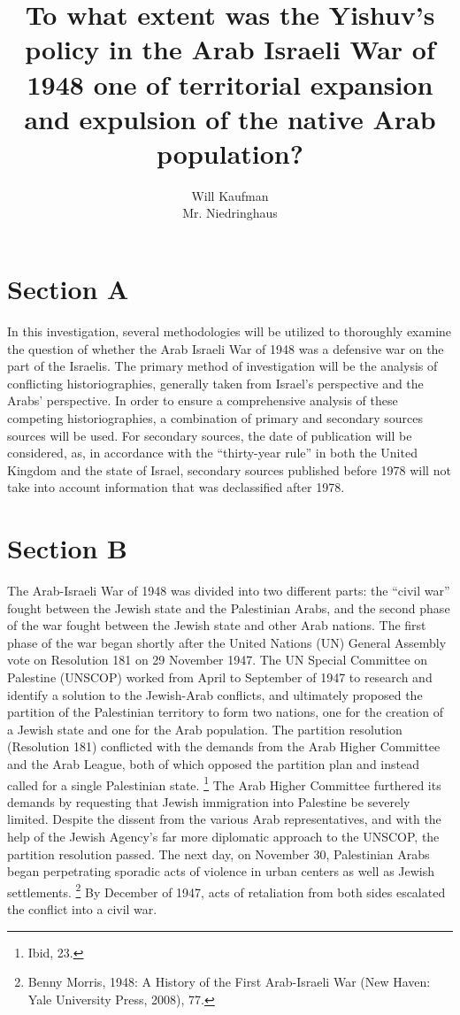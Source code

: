 \documentclass{turabian-researchpaper}
\begin{document}
\title{To what extent was the Yishuv's policy in the Arab Israeli War of 1948 one of territorial expansion and expulsion of the native Arab population?}

\author{Will Kaufman \\ Mr. Niedringhaus}
\maketitle

\section{Section A}
In this investigation, several methodologies will be utilized to thoroughly examine the question of whether the Arab Israeli War of 1948 was a defensive war on the part of the Israelis.  The primary method of investigation will be the analysis of conflicting historiographies, generally taken from Israel's perspective and the Arabs' perspective.  In order to ensure a comprehensive analysis of these competing historiographies, a combination of primary and secondary sources sources will be used.  For secondary sources, the date of publication will be considered, as, in accordance with the “thirty-year rule” in both the United Kingdom and the state of Israel, secondary sources published before 1978 will not take into account information that was declassified after 1978.

\section{Section B}
The Arab-Israeli War of 1948 was divided into two different parts: the “civil war” fought between the Jewish state and the Palestinian Arabs, and the second phase of the war fought between the Jewish state and other Arab nations.  The first phase of the war began shortly after the United Nations (UN) General Assembly vote on Resolution 181 on 29 November 1947.  The UN Special Committee on Palestine (UNSCOP) worked from April to September of 1947 to research and identify a solution to the Jewish-Arab conflicts, and ultimately proposed the partition of the Palestinian territory to form two nations, one for the creation of a Jewish state and one for the Arab population.
The partition resolution (Resolution 181) conflicted with the demands from the Arab Higher Committee and the Arab League, both of which opposed the partition plan and instead called for a single Palestinian state.
\footnote{Ibid, 23.}
The Arab Higher Committee furthered its demands by requesting that Jewish immigration into Palestine be severely limited.  Despite the dissent from the various Arab representatives, and with the help of the Jewish Agency's far more diplomatic approach to the UNSCOP, the partition resolution passed.  The next day, on November 30, Palestinian Arabs began perpetrating sporadic acts of violence in urban centers as well as Jewish settlements.
\footnote{Benny Morris, 1948: A History of the First Arab-Israeli War (New Haven: Yale University Press, 2008), 77.}
By December of 1947, acts of retaliation from both sides escalated the conflict into a civil war.
\end{document}
